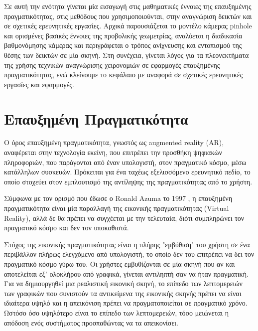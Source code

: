 

 \label{c:2}


Σε αυτή την ενότητα γίνεται μία εισαγωγή στις μαθηματικές έννοιες της επαυξημένης πραγματικότητας, στις μεθόδους που χρησιμοποιούνται, στην αναγνώριση δεικτών και σε σχετικές ερευνητικές εργασίες. Αρχικά παρουσιάζεται το μοντέλο κάμερας pinhole και ορισμένες βασικές έννοιες της προβολικής γεωμετρίας, αναλύεται η διαδικασία βαθμονόμησης κάμερας και περιγράφεται ο τρόπος ανίχνευσης και εντοπισμού της θέσης των δεικτών σε μία σκηνή. Στη συνέχεια, γίνεται λόγος για τα πλεονεκτήματα της χρήσης τεχνικών αναγνώρισης χειρονομιών σε εφαρμογές επαυξημένης πραγματικότητας, ενώ κλείνουμε το κεφάλαιο με αναφορά σε σχετικές ερευνητικές εργασίες και εφαρμογές.



\section{Επαυξημένη Πραγματικότητα}


Ο όρος επαυξημένη πραγματικότητα, γνωστός ως augmented reality (AR), αναφέρεται στην τεχνολογία εκείνη, που επιτρέπει την προσθήκη ψηφιακών πληροφοριών, που παράγονται από έναν υπολογιστή, στον πραγματικό κόσμο, μέσω κατάλληλων συσκευών. Πρόκειται για ένα ταχέως εξελισσόμενο ερευνητικό πεδίο, το οποίο στοχεύει στον εμπλουτισμό της αντίληψης της πραγματικότητας από το χρήστη.


Σύμφωνα με τον ορισμό που έδωσε ο Ronald Azuma το 1997 \cite{azuma1997} , η επαυξημένη πραγματικότητα είναι μία παραλλαγή της εικονικής πραγματικότητας (Virtual Reality), αλλά δε θα πρέπει να συγχέεται με την τελευταία, διότι συμπληρώνει τον πραγματικό κόσμο και δεν τον υποκαθιστά. 



Στόχος της εικονικής πραγματικότητας είναι η πλήρης "εμβύθιση" του χρήστη σε ένα περιβάλλον πλήρως ελεγχόμενο από υπολογιστή, το οποίο δεν του επιτρέπει να δει τον πραγματικό κόσμο γύρω του. Οι χρήστες εμβυθίζονται σε μία σκηνή που αν και αποτελείται εξ' ολοκλήρου από γραφικά, γίνεται αντιληπτή σαν να ήταν πραγματική. Για να δημιουργηθεί μια ρεαλιστική εικονική σκηνή, το επίπεδο των λεπτομερειών των γραφικών που συνιστούν τα αντικείμενα της εικονικής σκηνής πρέπει να είναι ιδιαίτερα υψηλό και η απεικόνιση πρέπει να πραγματοποιείται σε πραγματικό χρόνο. Ωστόσο όσο υψηλότερο είναι το επίπεδο των λεπτομερειών, τόσο μειώνεται η απόδοση ενός συστήματος προσπαθώντας να τα απεικονίσει. 


